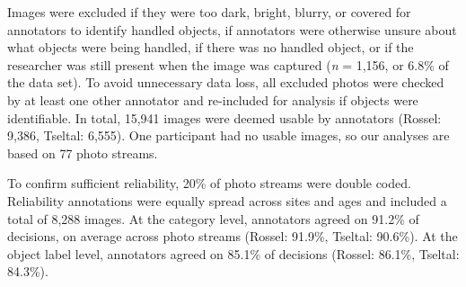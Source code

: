 \documentclass[10pt, letterpaper]{article}
\begin{document}
Images were excluded if they were too dark, bright, blurry, or covered
for annotators to identify handled objects, if annotators were otherwise
unsure about what objects were being handled, if there was no handled
object, or if the researcher was still present when the image was
captured (\emph{n} = 1,156, or 6.8\% of the data set). To avoid
unnecessary data loss, all excluded photos were checked by at least one
other annotator and re-included for analysis if objects were
identifiable. In total, 15,941 images were deemed usable by annotators
(Rossel: 9,386, Tseltal: 6,555). One participant had no usable images,
so our analyses are based on 77 photo streams.

To confirm sufficient reliability, 20\% of photo streams were double
coded. Reliability annotations were equally spread across sites and ages
and included a total of 8,288 images. At the category level, annotators
agreed on 91.2\% of decisions, on average across photo streams (Rossel:
91.9\%, Tseltal: 90.6\%). At the object label level, annotators agreed
on 85.1\% of decisions (Rossel: 86.1\%, Tseltal: 84.3\%).

\begin{table}[!ht]

\caption{\label{tab:top-objects}Number of unique objects (N) and objects handled by the most children, for each category, across sites.}
\centering
{}
\end{table}
\end{document}
